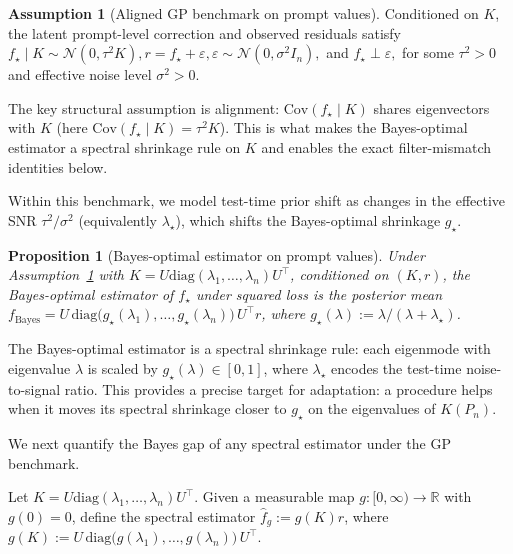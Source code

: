 \documentclass{article}
\theoremstyle{plain}
\newtheorem{proposition}[theorem]{Proposition}
\theoremstyle{definition}
\newtheorem{assumption}[theorem]{Assumption}
\theoremstyle{remark}
\begin{document}
\begin{assumption}[Aligned GP benchmark on prompt values]
\label{assump:gp_prompt_prior_sec5}
Conditioned on $K$, the latent prompt-level correction and observed residuals satisfy $f_\star \mid K \sim \mathcal{N}(0,\tau^2 K), r = f_\star + \varepsilon,
\varepsilon\sim\mathcal{N}(0,\sigma^2 I_n),$ and $
f_\star\perp \varepsilon,$ for some $\tau^2>0$ and effective noise level $\sigma^2>0$.
\end{assumption}

The key structural assumption is alignment: $\mathrm{Cov}(f_\star\mid K)$ shares eigenvectors with $K$ (here $\mathrm{Cov}(f_\star\mid K)=\tau^2 K$). This is what makes the Bayes-optimal estimator a spectral shrinkage rule on $K$ and enables the exact filter-mismatch identities below.

Within this benchmark, we model test-time prior shift as changes in the effective SNR $\tau^2/\sigma^2$ (equivalently $\lambda_\star$), which shifts the Bayes-optimal shrinkage $g_\star$.


\begin{proposition}[Bayes-optimal estimator on prompt values]
\label{prop:bayes_filter_sec5}
Under Assumption~\ref{assump:gp_prompt_prior_sec5} with $K=U\mathrm{diag}(\lambda_1,\dots,\lambda_n)U^\top$, conditioned on $(K,r)$, the Bayes-optimal estimator of $f_\star$
under squared loss is the posterior mean $f_{\mathrm{Bayes}} = U\,\mathrm{diag}\!\bigl(g_\star(\lambda_1),\dots,g_\star(\lambda_n)\bigr)\,U^\top r$, where $g_\star(\lambda):=\lambda/(\lambda+\lambda_\star)$.
\end{proposition}


The Bayes-optimal estimator is a spectral shrinkage rule: each eigenmode with eigenvalue $\lambda$ is scaled by $g_\star(\lambda)\in[0,1]$, where $\lambda_\star$ encodes the test-time noise-to-signal ratio. This provides a precise target for adaptation: a procedure helps when it moves its spectral shrinkage closer to $g_\star$ on the eigenvalues of $K(P_n)$.


We next quantify the Bayes gap of any spectral estimator under the GP benchmark.

Let $K=U\mathrm{diag}(\lambda_1,\dots,\lambda_n)U^\top$.
Given a measurable map $g:[0,\infty)\to\mathbb{R}$ with $g(0)=0$, define the spectral estimator $\hat f_g := g(K)r$, where $g(K):=U\,\mathrm{diag}\!\bigl(g(\lambda_1),\dots,g(\lambda_n)\bigr)\,U^\top.$
\end{document}
